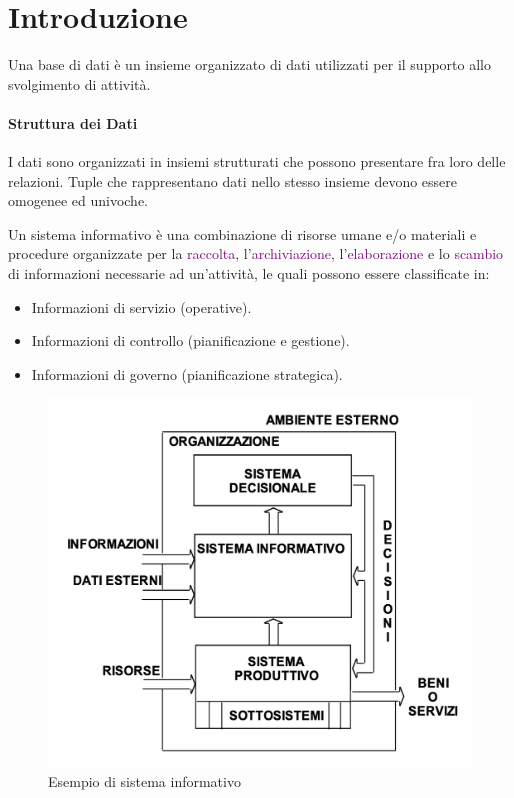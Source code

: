 \section{Introduzione}

    \begin{definition}
        Una base di dati è un insieme organizzato di dati utilizzati per il supporto allo svolgimento di attività.
    \end{definition}

    \paragraph*{Struttura dei Dati}
    I dati sono organizzati in insiemi strutturati che possono presentare fra loro delle relazioni. Tuple che rappresentano dati nello stesso insieme devono essere omogenee ed univoche.

    \begin{definition}
        Un sistema informativo è una combinazione di risorse umane e/o materiali e procedure organizzate per
        la \textcolor{purple}{raccolta}, l'\textcolor{purple}{archiviazione}, l'\textcolor{purple}{elaborazione}
        e lo \textcolor{purple}{scambio} di informazioni necessarie ad un'attività, le quali possono essere classificate in:
        \begin{itemize}
            \item Informazioni di servizio (operative).
            \item Informazioni di controllo (pianificazione e gestione).
            \item Informazioni di governo (pianificazione strategica).
        \end{itemize}
        \begin{figure}[h]
            \centering
            \includegraphics[scale=0.5]{img/sistema_informativo.png}
            \caption{Esempio di sistema informativo}
        \end{figure}
    \end{definition}

